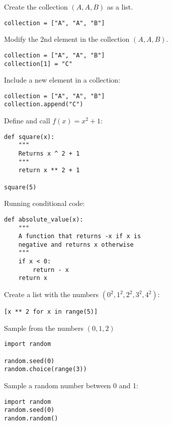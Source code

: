 \documentclass{article}
\begin{document}
\begin{multicols}{2}
    Create the collection \((A, A, B)\) as a list.
 
        \begin{verbatim}
collection = ["A", "A", "B"]
    \end{verbatim}

        Modify the 2nd element in the collection \((A, A, B)\).

        \begin{verbatim}
collection = ["A", "A", "B"]
collection[1] = "C"
        \end{verbatim}

        Include a new element in a collection:

        \begin{verbatim}
collection = ["A", "A", "B"]
collection.append("C")
        \end{verbatim}

        Define and call $f(x)=x^2 + 1$:

        \begin{verbatim}
def square(x):
    """
    Returns x ^ 2 + 1
    """
    return x ** 2 + 1

square(5)
        \end{verbatim}

        \vspace{2cm}
        Running conditional code:

        \begin{verbatim}
def absolute_value(x):
    """
    A function that returns -x if x is 
    negative and returns x otherwise
    """
    if x < 0:
        return - x
    return x
        \end{verbatim}

        Create a list with the numbers $(0 ^ 2, 1 ^ 2, 2 ^ 2, 3 ^ 2, 4 ^ 2)$:

        \begin{verbatim}
[x ** 2 for x in range(5)]
        \end{verbatim}

        Sample from the numbers $(0, 1, 2)$

        \begin{verbatim}
import random

random.seed(0)
random.choice(range(3))
        \end{verbatim}

        Sample a random number between 0 and 1:

        \begin{verbatim}
import random
random.seed(0)
random.random()
        \end{verbatim}
\end{multicols}
\end{document}
